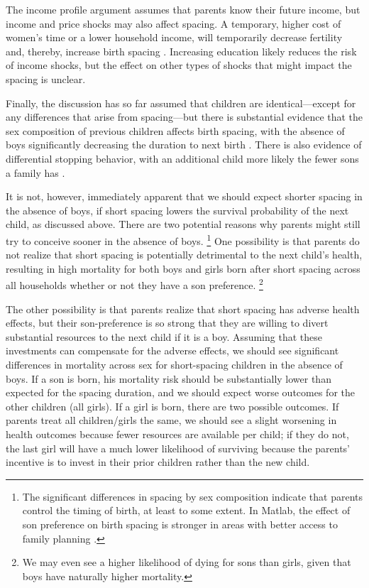 The income profile argument assumes that parents know their future income, 
but income and price shocks may also affect spacing. 
A temporary, higher cost of women's time or a lower household income, will 
temporarily decrease fertility and, thereby, increase birth spacing 
\citep{Moffitt1984,Hotz1988,Portner2001,Alam2018}.
Increasing education likely reduces the risk of income shocks, but the 
effect on other types of shocks that might impact the spacing is unclear.


Finally, the discussion has so far assumed that children are identical---except 
for any differences that arise from spacing---but there is substantial evidence 
that the sex composition of previous children affects birth spacing, with the
absence of boys significantly decreasing the duration to next birth
\citep{Haughton1995,Haughton1996,Rahman1993,Bhalotra2008,Kumar2016,Soest2018}.
There is also evidence of differential stopping behavior, with an additional child 
more likely the fewer sons a family has 
\citep{repetto72,Das1987,Arnold1997,arnold98,clark00,Basu2010,Barcellos2014}.

It is not, however, immediately apparent that we should expect shorter spacing in 
the absence of boys, if short spacing lowers the survival probability of the 
next child, as discussed above.
There are two potential reasons why parents might still try to conceive sooner 
in the absence of boys.%
\footnote{
The significant differences in spacing by sex composition indicate that
parents control the timing of birth, at least to some extent.
In Matlab, the effect of son preference on birth spacing is stronger in 
areas with better access to family planning \citep{Rahman1993}.
}
One possibility is that parents do not realize that short spacing is potentially
detrimental to the next child's health, resulting in high mortality for both boys 
and girls born after short spacing across all households whether or not they have 
a son preference.%
\footnote{
We may even see a higher likelihood of dying for sons than girls, given that boys 
have naturally higher mortality.
}

The other possibility is that parents realize that short spacing has adverse 
health effects, but their son-preference is so strong that they are willing to 
divert substantial resources to the next child if it is a boy.
Assuming that these investments can compensate for the adverse effects,
we should see significant differences in mortality across sex for short-spacing 
children in the absence of boys.
If a son is born, his mortality risk should be substantially lower than expected 
for the spacing duration, and we should expect worse outcomes for the other 
children (all girls).
If a girl is born, there are two possible outcomes.
If parents treat all children/girls the same, we should see a slight worsening in 
health outcomes because fewer resources are available per child; 
if they do not, the last girl will have a much lower likelihood of surviving 
because the parents' incentive is to invest in their prior children rather than 
the new child.

